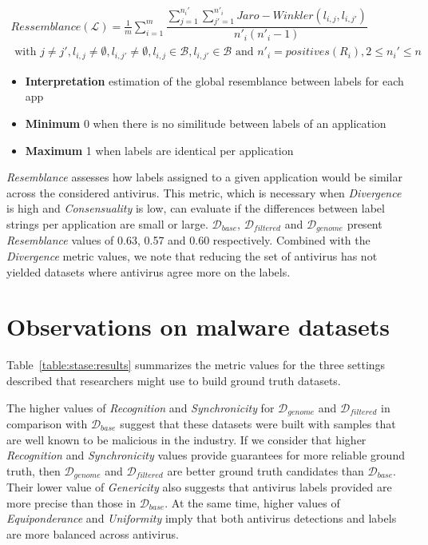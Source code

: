 \begin{mdframed}[hidealllines=true,nobreak=true]
\begin{gather*}
	Ressemblance(\mathcal{L}) = \frac{1}{m} \sum^{m}_{i=1}\dfrac{\sum^{n_i'}_{j=1} \sum^{n'_i}_{j'=1}
		Jaro-Winkler(l_{i,j}, l_{i,j'})}{n'_i (n'_i-1)} \\ \text{ with }
	j \neq j', l_{i,j} \neq \emptyset, l_{i,j'} \neq \emptyset,
	l_{i,j} \in \mathcal{B}, l_{i,j'} \in \mathcal{B} \text{ and }
	n'_i = positives(R_i), 2 \leq n_i' \leq n
\end{gather*}

\begin{itemize}
	\item{\textbf{Interpretation}} estimation of the global resemblance between labels for each app
	\item{\textbf{Minimum}} 0 when there is no similitude between labels of an application
	\item{\textbf{Maximum}} 1 when labels are identical per application
\end{itemize}
\end{mdframed}

\emph{Resemblance} assesses how labels assigned to a given application would be similar across the considered antivirus.
This metric, which is necessary when \emph{Divergence} is high and \emph{Consensuality} is low, can evaluate if the differences between label strings per application are small or large.
$\mathcal{D}_{base}$, $\mathcal{D}_{filtered}$ and $\mathcal{D}_{genome}$ present \emph{Resemblance} values of 0.63, 0.57 and 0.60 respectively.
Combined with the \emph{Divergence} metric values, we note that reducing the set of antivirus has not yielded datasets where antivirus agree more on the labels.
\section{Observations on malware datasets}
Table~\ref{table:stase:results} summarizes the metric values for the three settings described that researchers might use to build ground truth datasets.



The higher values of \emph{Recognition} and \emph{Synchronicity} for $\mathcal{D}_{genome}$ and $\mathcal{D}_{filtered}$ in comparison with $\mathcal{D}_{base}$ suggest that these datasets were built with samples that are well known to be malicious in the industry.
If we consider that higher \emph{Recognition} and \emph{Synchronicity} values provide guarantees for more reliable ground truth, then $\mathcal{D}_{genome}$ and $\mathcal{D}_{filtered}$ are better ground truth candidates than $\mathcal{D}_{base}$.
Their lower value of \emph{Genericity} also suggests that antivirus labels provided are more precise than those in $\mathcal{D}_{base}$.
At the same time, higher values of \emph{Equiponderance} and \emph{Uniformity} imply that both antivirus detections and labels are more balanced across antivirus.

